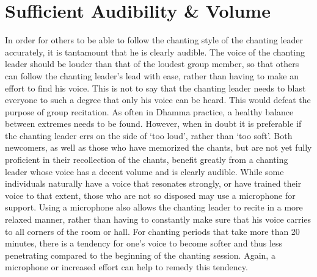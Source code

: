 \section{Sufficient Audibility \& Volume}
In order for others to be able to follow the chanting style of the chanting leader accurately, it is tantamount that he is clearly audible. The voice of the chanting leader should be louder than that of the loudest group member, so that others can follow the chanting leader’s lead with ease, rather than having to make an effort to find his voice. This is not to say that the chanting leader needs to blast everyone to such a degree that only his voice can be heard. This would defeat the purpose of group recitation. As often in Dhamma practice, a healthy balance between extremes needs to be found. However, when in doubt it is preferable if the chanting leader errs on the side of ‘too loud’, rather than ‘too soft’. Both newcomers, as well as those who have memorized the chants, but are not yet fully proficient in their recollection of the chants, benefit greatly from a chanting leader whose voice has a decent volume and is clearly audible. While some individuals naturally have a voice that resonates strongly, or have trained their voice to that extent, those who are not so disposed may use a microphone for support. Using a microphone also allows the chanting leader to recite in a more relaxed manner, rather than having to constantly make sure that his voice carries to all corners of the room or hall. For chanting periods that take more than 20 minutes, there is a tendency for one’s voice to become softer and thus less penetrating compared to the beginning of the chanting session. Again, a microphone or increased effort can help to remedy this tendency.\\

